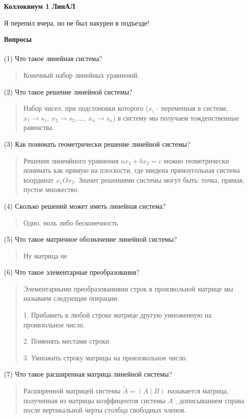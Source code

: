 \documentclass{article}
\begin{document}
\setlength{\parindent}{0pt}
\begin{Large}
    \textsf{\textbf{Коллоквиум 1 ЛинАЛ}}
    
    Я перепил вчера, но не был накурен в подъезде!
\end{Large}
\vspace{1cm}

\large\textsf{\textbf{Вопросы}}
\\
\\
(1) Что такое линейная система? 
\begin{quote}
    Конечный набор линейных уравнений.
\end{quote}

(2) Что такое решение линейной системы? 
\begin{quote}
    Набор чисел, при подстоновки которого ($x_i$ - переменная в системе, $x_1 \rightarrow s_1, \ x_2 \rightarrow s_2 , ... , \ x_n \rightarrow s_n$) в систему мы получаем тожденственные равенства.
\end{quote}

(3) Как понимать геометрически решение линейной системы? 
\begin{quote}
   Решения линенйного уравнения $ax_1 + bx_2 = c$ можно геометрически понимать как прямую на плоскости, где введена прямоугольная система координат $x_1Ox_2$. Значит решениями системы могут быть: точка, прямая, пустое множество.
\end{quote}

(4) Сколько решений может иметь линейная система? 
\begin{quote}
    Одно, ноль либо бесконечность
\end{quote}

(5) Что такое матричное обозначение линейной системы? 
\begin{quote}
Ну матрица че
\end{quote}

(6) Что такое элементарные преобразования? 
\begin{quote}
    Элементарными преобразованиями строк в произвольной матрице мы называем следующие операции: 
    
    1. Прибавить к любой строке матрице другую умноженную на проивзольное число. 
    
    2. Поменять местами строки. 
    
    3. Умножить строку матрицы на произовольное число. 
\end{quote}

(7) Что такое расширенная матрица линейной системы? 
\begin{quote}
Расширенной матрицей системы $\widetilde{A}=(A \mid B)$ называется матрица, полученная из матрицы коэффицентов системы $A$ , дописыванием справа после вертикальной черты столбца свободных членов.
\end{quote}
\end{document}

